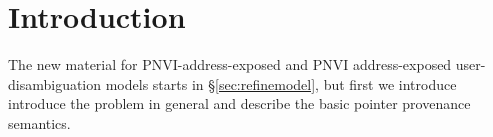 \documentclass[acmsmall,review,screen]{acmart}\settopmatter{printfolios=true,printccs=false,printacmref=false}
\begin{document}
\maketitle



\newcommand{\myt}[1]{{\color{blue}#1}}
\newcommand{\myu}[1]{{\color{myudicolor}#1}}

\tableofcontents

\vspace*{-2\baselineskip}
\section{Introduction}

The new material for PNVI-address-exposed and PNVI address-exposed
user-disambiguation models starts in \S\ref{sec:refinemodel}, but
first we introduce introduce the problem in general and describe the
basic pointer provenance semantics. 
\end{document}
